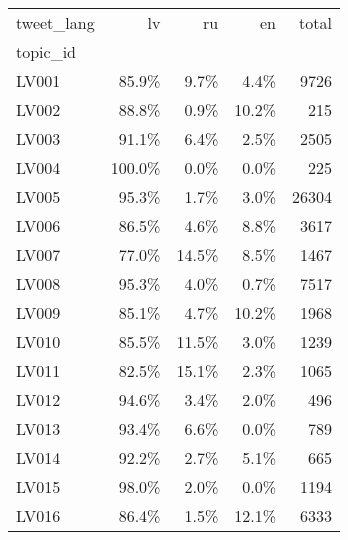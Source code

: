 \begin{tabular}{lrrrr}
\toprule
tweet\_lang &     lv &    ru &    en &  total \\
topic\_id &        &       &       &        \\
\midrule
LV001    &  85.9\% &  9.7\% &  4.4\% &   9726 \\
LV002    &  88.8\% &  0.9\% & 10.2\% &    215 \\
LV003    &  91.1\% &  6.4\% &  2.5\% &   2505 \\
LV004    & 100.0\% &  0.0\% &  0.0\% &    225 \\
LV005    &  95.3\% &  1.7\% &  3.0\% &  26304 \\
LV006    &  86.5\% &  4.6\% &  8.8\% &   3617 \\
LV007    &  77.0\% & 14.5\% &  8.5\% &   1467 \\
LV008    &  95.3\% &  4.0\% &  0.7\% &   7517 \\
LV009    &  85.1\% &  4.7\% & 10.2\% &   1968 \\
LV010    &  85.5\% & 11.5\% &  3.0\% &   1239 \\
LV011    &  82.5\% & 15.1\% &  2.3\% &   1065 \\
LV012    &  94.6\% &  3.4\% &  2.0\% &    496 \\
LV013    &  93.4\% &  6.6\% &  0.0\% &    789 \\
LV014    &  92.2\% &  2.7\% &  5.1\% &    665 \\
LV015    &  98.0\% &  2.0\% &  0.0\% &   1194 \\
LV016    &  86.4\% &  1.5\% & 12.1\% &   6333 \\
\bottomrule
\end{tabular}
